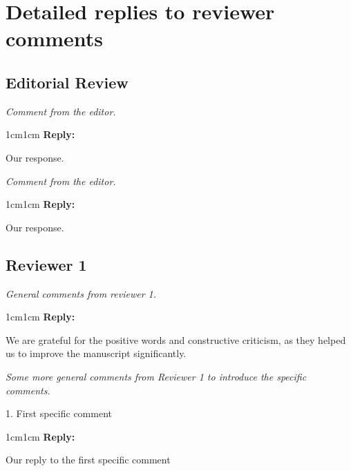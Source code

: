 \documentclass[11pt]{article}
\newenvironment{reviewer}{\itshape}{}
\newenvironment{reply}{%
    \begin{adjustwidth}{1cm}{1cm}%
    \color{grayreply}\textbf{Reply:\ }%
    \ignorespaces%
}{\end{adjustwidth}}
\begin{document}
\section*{Detailed replies to reviewer comments}

\subsection*{Editorial Review}

\begin{minipage}{\linewidth}
    \begin{reviewer}
        Comment from the editor.
    \end{reviewer}

    \begin{reply}
        Our response.
    \end{reply}
\end{minipage}

\begin{minipage}{\linewidth}
    \begin{reviewer}
        Comment from the editor.
    \end{reviewer}

    \begin{reply}
        Our response.
    \end{reply}
\end{minipage}


\subsection*{Reviewer 1}

\begin{minipage}{\linewidth}
    \begin{reviewer}
        General comments from reviewer 1.
    \end{reviewer}

    \begin{reply}
        We are grateful for the positive words and constructive criticism, as they helped us to improve the manuscript significantly.
    \end{reply}
\end{minipage}


\begin{minipage}{\linewidth}
    \begin{reviewer}
        Some more general comments from Reviewer 1 to introduce the specific comments.

        1. First specific comment
    \end{reviewer}

    \begin{reply}
        Our reply to the first specific comment
    \end{reply}
\end{minipage}
\end{document}
